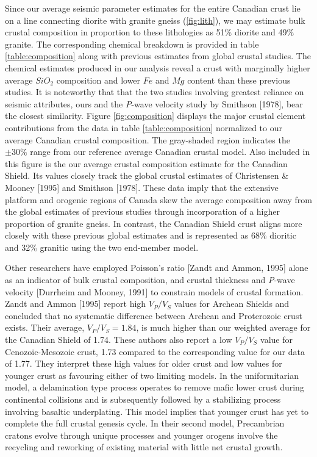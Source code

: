 \documentclass[draft, 12pt]{article}
\begin{document}
Since our average seismic parameter estimates for the entire Canadian crust lie on a line connecting diorite with granite gneiss (\ref{fig:lith}), we may estimate bulk crustal composition in proportion to these lithologies as 51\% diorite and 49\% granite. The corresponding chemical breakdown is provided in table \ref{table:composition} along with previous estimates from global crustal studies. The chemical estimates produced in our analysis reveal a crust with marginally higher average $SiO_2$ composition and lower $Fe$ and $Mg$ content than these previous studies. It is noteworthy that that the two studies involving greatest reliance on seismic attributes, ours and the {\it P}-wave velocity study by Smithson [1978], bear the closest similarity. Figure \ref{fig:composition} displays the major crustal element contributions from the data in table \ref{table:composition} normalized to our average Canadian crustal composition. The gray-shaded region indicates the $\pm 30\%$ range from our reference average Canadian crustal model.  Also included in this figure is the our average crustal composition estimate for the Canadian Shield. Its values closely track the global crustal estimates of Christensen \& Mooney [1995] and Smithson [1978]. These data imply that the extensive platform and orogenic regions of Canada skew the average composition away from the global estimates of previous studies through incorporation of a higher proportion of granite gneiss. In contrast, the Canadian Shield crust aligns more closely with these previous global estimates and is represented as 68\% dioritic and 32\% granitic using the two end-member model.

Other researchers have employed Poisson's ratio [Zandt and Ammon, 1995] alone as an indicator of bulk crustal composition, and crustal thickness and {\it P}-wave velocity [Durrheim and Mooney, 1991] to constrain models of crustal formation. Zandt and Ammon [1995] report high $V_P/V_S$ values for Archean Shields and concluded that no systematic difference between Archean and Proterozoic crust exists. Their average, $V_P/V_S=1.84$, is much higher than our weighted average for the Canadian Shield of 1.74. These authors also report a low $V_P/V_S$ value for Cenozoic-Mesozoic crust, 1.73 compared to the corresponding value for our data of 1.77. They interpret these high values for older crust and low values for younger crust as favouring either of two limiting models. In the uniformitarian model, a delamination type process operates to remove mafic lower crust during continental collisions and is subsequently followed by a stabilizing process involving basaltic underplating. This model implies that younger crust has yet to complete the full crustal genesis cycle. In their second model, Precambrian cratons evolve through unique processes and younger orogens involve the recycling and reworking of existing material with little net crustal growth.
\end{document}
